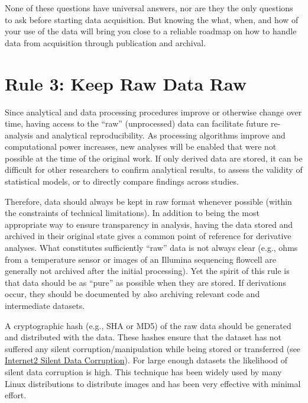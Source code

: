 \documentclass[10pt,letterpaper]{article}
\begin{document}
None of these questions have universal answers, nor are they the only
questions to ask before starting data acquisition. But knowing the what,
when, and how of your use of the data will bring you close to a reliable
roadmap on how to handle data from acquisition through publication and
archival.

\section*{Rule 3: Keep Raw Data Raw}\label{rule-3-keep-raw-data-raw}

Since analytical and data processing procedures improve or otherwise
change over time, having access to the ``raw'' (unprocessed) data can
facilitate future re-analysis and analytical reproducibility. As
processing algorithms improve and computational power increases, new
analyses will be enabled that were not possible at the time of the
original work. If only derived data are stored, it can be difficult for
other researchers to confirm analytical results, to assess the validity
of statistical models, or to directly compare findings across studies.

Therefore, data should always be kept in raw format whenever possible
(within the constraints of technical limitations). In addition to being
the most appropriate way to ensure transparency in analysis, having the
data stored and archived in their original state gives a common point of
reference for derivative analyses. What constitutes sufficiently ``raw''
data is not always clear (e.g., ohms from a temperature sensor or images
of an Illumina sequencing flowcell are generally not archived after the
initial processing). Yet the spirit of this rule is that data should be
as ``pure'' as possible when they are stored. If derivations occur, they
should be documented by also archiving relevant code and intermediate
datasets.

A cryptographic hash (e.g., SHA or MD5) of the raw data should be
generated and distributed with the data. These hashes ensure that the
dataset has not suffered any silent corruption/manipulation while being
stored or transferred (see
\href{https://www.xsede.org/news/-/news/item/6390}{Internet2 Silent Data
Corruption}). For large enough datasets the likelihood of silent data
corruption is high. This technique has been widely used by many Linux
distributions to distribute images and has been very effective with
minimal effort.
\end{document}
